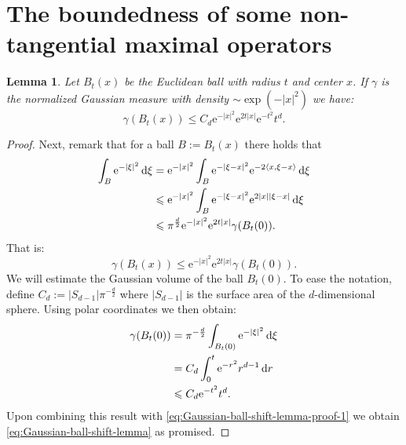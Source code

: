 \documentclass[a4paper,oneside,10pt]{amsproc}
\theoremstyle{plain}
\newtheorem{lemma}{Lemma}
\theoremstyle{remark}
\theoremstyle{definition}
\newcommand{\D}{\,\textup{d}}
\newcommand{\la}{\langle}
\newcommand{\ra}{\rangle}
\renewcommand{\leq}{\leqslant}
\renewcommand{\leq}{\leqslant}
\newcommand{\e}{\mathrm{e}} %
\renewcommand{\leq}{\leqslant}%
\begin{document}
\section{The boundedness of some non-tangential maximal operators}
\begin{lemma}\label{lem:Gaussian-ball-shift-lemma}
  Let $B_t(x)$ be the Euclidean ball with radius $t$ and center $x$.
  If $\gamma$ is the normalized Gaussian measure with density
  $\sim\exp(-|x|^2)$ we have:
  \begin{equation}\label{eq:Gaussian-ball-shift-lemma}
    \gamma(B_t(x)) \leq C_d \e^{-|x|^2} \e^{2 t |x|} \e^{-t^2} t^d.
  \end{equation}
\end{lemma}
\begin{proof}
    Next, remark that for a ball $B:= B_t(x)$ there holds that
  \begin{align*}
    \int_B \e^{-|\xi|^2} \D\xi &= \e^{-|x|^2} \int_{B} \e^{-|\xi -
      x|^2} \e^{-2 \la x, \xi - x \ra} \D\xi\\
    &\leq \e^{-|x|^2} \int_{B} \e^{-|\xi - x|^2} \e^{2 |x| |\xi - x|}
    \D\xi\\
    &\leq \pi^{\frac{d}2} \e^{-|x|^2} \e^{2 t |x|} \gamma(B_t(0)).
  \end{align*}
  That is:
  \begin{equation}\label{eq:Gaussian-ball-shift-lemma-proof-1}
    \gamma(B_t(x)) \leq \e^{-|x|^2} \e^{2 t |x|} \gamma(B_t(0)).
  \end{equation}
  We will estimate the Gaussian volume of the ball $B_t(0)$. To ease
  the notation, define $C_d := |S_{d - 1}| \pi^{-\frac{d}2}$ where
  $|S_{d - 1}|$ is the surface area of the $d$-dimensional sphere.
  Using polar coordinates we then obtain:
  \begin{align*}
    \gamma(B_t(0)) &= \pi^{-\frac{d}2} \int_{B_t(0)} \e^{-|\xi|^2} \D\xi\\
    &= C_d  \int_0^t \e^{-r^2} r^{d - 1} \D{r}\\
    &\leq C_d  \e^{-t^2} t^d.
  \end{align*}
  Upon combining this result with
  \eqref{eq:Gaussian-ball-shift-lemma-proof-1} we obtain
  \eqref{eq:Gaussian-ball-shift-lemma} as promised.
\end{proof}
\end{document}
